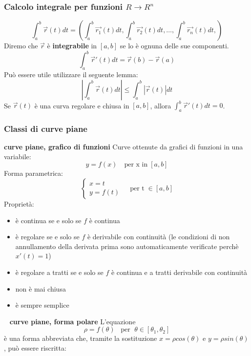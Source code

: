 \subsubsection{Calcolo integrale per funzioni $R \rightarrow R^n$}
\[
    \int_{a}^{b} \vec{r}(t) dt =\left( \int_{a}^{b}\vec{r_1}(t) dt,\int_{a}^{b}\vec{r_2}(t) dt, \dots, \int_{a}^{b}\vec{r_n}(t) dt,\right)
\]
Diremo che $\vec{r}$ è \textbf{integrabile} in $[a,b]$ se lo è ognuna delle sue componenti.\newline
\[
    \int_{a}^{b} \vec{r}'(t) dt = \vec{r}(b) - \vec{r}(a)
\]
Può essere utile utilizzare il seguente lemma:
\[
    \left| \int_{a}^{b}\vec{r}(t)dt \right| \leq \int_{a}^{b}|\vec{r}(t)|dt
\]
Se $\vec{r}(t)$ è una curva regolare e chiusa in $[a,b]$, allora $\int_{a}^{b}\vec{r}'(t) dt =0$.\newline
\subsubsection{Classi di curve piane}
\textbf{curve piane, grafico di funzioni}\newline
\newline
Curve ottenute da grafici di funzioni in una variabile:
\[
    y = f(x) \quad\text{per x in} \;[a,b]
\]
Forma parametrica:
\[
    \begin{cases}
        x=t \\
        y=f(t)
    \end{cases} \;\;\;\; \text{per t} \;\in[a,b]
\]
Proprietà:
\begin{itemize}
    \item è continua se e solo se $f$ è continua
    \item è regolare se e solo se $f$ è derivabile con continuità (le condizioni di non annullamento della derivata prima sono automaticamente verificate perchè $x'(t) = 1$)
    \item è regolare a tratti se e solo se $f$ è continua e a tratti derivabile con continuità
    \item non è mai chiusa
    \item è sempre semplice
\end{itemize}
\ \newline
\textbf{curve piane, forma polare}\newline
\newline
L'equazione
\[
    \rho = f(\theta) \;\;\;\text{per } \; \theta \in [\theta_1, \theta_2]
\]
è una forma abbreviata che, tramite la sostituzione $x= \rho cos(\theta)$ e $y= \rho sin(\theta)$, può essere riscritta:
